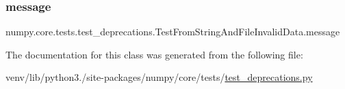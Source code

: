 \subsubsection{\texorpdfstring{message}{message}}
{\footnotesize\ttfamily numpy.\+core.\+tests.\+test\+\_\+deprecations.\+Test\+From\+String\+And\+File\+Invalid\+Data.\+message\hspace{0.3cm}{\ttfamily [static]}}



The documentation for this class was generated from the following file\+:\begin{DoxyCompactItemize}
\item 
venv/lib/python3./site-\/packages/numpy/core/tests/\hyperlink{core_2tests_2test__deprecations_8py}{test\+\_\+deprecations.\+py}\end{DoxyCompactItemize}
